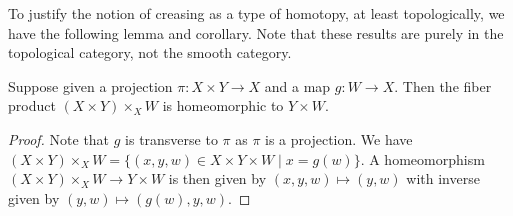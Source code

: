 To justify the notion of creasing as a type of homotopy, at least topologically, we have the following lemma and corollary.
Note that these results are purely in the topological category, not the smooth category.

\begin{lemma}
	Suppose given a projection $\pi \colon X \times Y \to X$ and a map $g \colon W \to X$.
	Then the fiber product $(X \times Y) \times_X W$ is homeomorphic to $Y \times W$.
\end{lemma}

\begin{proof}
	Note that $g$ is transverse to $\pi$ as $\pi$ is a projection.
	We have $(X \times Y) \times_X W = \{(x,y,w) \in X \times Y \times W \mid x = g(w)\}$.
	A homeomorphism $(X \times Y) \times_X W \to Y \times W$ is then given by $(x,y,w) \mapsto (y,w)$ with inverse given by $(y,w) \mapsto (g(w),y,w)$.
\end{proof}


